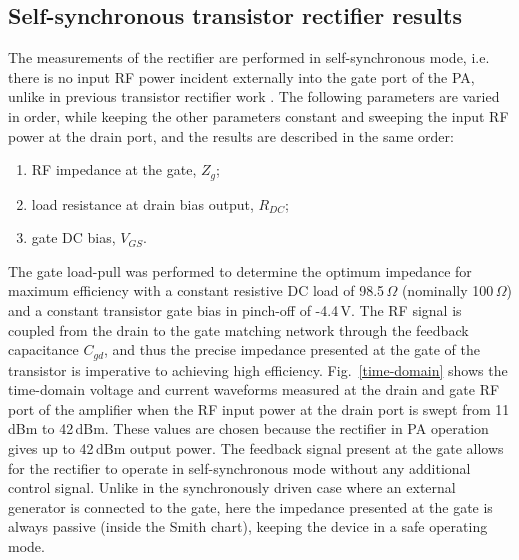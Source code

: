 \documentclass[journal]{IEEEtran}
\begin{document}
\subsection {Self-synchronous transistor rectifier results}

The measurements of the rectifier are performed in self-synchronous mode, i.e. there is no input RF power incident externally into the gate port of the PA, unlike in previous transistor rectifier work \cite{JoseIMS-rect,Kaz}. The following parameters are varied in order, while keeping the other parameters constant and sweeping the input RF power at the drain port, and the results are described in the same order:

\begin{enumerate}
\item RF impedance at the gate, $Z_g$;
\item load resistance at drain bias output, $R_{DC}$;
\item gate DC bias, $V_{GS}$.
\end{enumerate}

The gate load-pull was performed to determine the optimum impedance for maximum efficiency with a constant resistive DC load of 98.5\,$\Omega$ (nominally 100\,$\Omega$) and a constant transistor gate bias in pinch-off of -4.4\,V. The RF signal is coupled from the drain to the gate matching network through the feedback capacitance $C_{gd}$, and thus the precise impedance presented at the gate of the transistor is imperative to achieving high efficiency. Fig.~\ref{time-domain} shows the time-domain voltage and current waveforms measured at the drain and gate RF port of the amplifier when the RF input power at the drain port is swept from 11\,dBm to 42\,dBm. These values are chosen because the rectifier in PA operation gives up to 42\,dBm output power. The feedback signal present at the gate allows for the rectifier to operate in self-synchronous mode without any additional control signal. Unlike in the synchronously driven case where an external generator is connected to the gate, here the impedance presented at the gate is always passive (inside the Smith chart), keeping the device in a safe operating mode.
\end{document}
